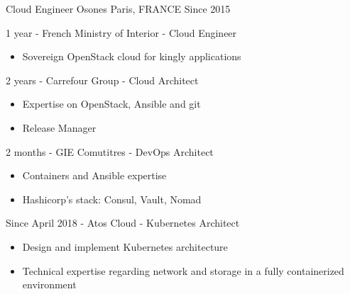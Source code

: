 

\begin{cventries}

  \cventry
    {Cloud Engineer} %
    {Osones} %
    {Paris, FRANCE} %
    {Since 2015} %
    {
      \begin{cvitems} %
      \item {1 year - French Ministry of Interior - Cloud Engineer}
        \begin{itemize}
          \item {Sovereign OpenStack cloud for kingly applications}
        \end{itemize}

      \item {2 years - Carrefour Group - Cloud Architect}
        \begin{itemize}
          \item {Expertise on OpenStack, Ansible and git}
          \item {Release Manager}
        \end{itemize}

      \item {2 months - GIE Comutitres - DevOps Architect}
        \begin{itemize}
          \item {Containers and Ansible expertise}
          \item {Hashicorp's stack: Consul, Vault, Nomad}
        \end{itemize}

      \item {Since April 2018 - Atos Cloud - Kubernetes Architect}
        \begin{itemize}
          \item {Design and implement Kubernetes architecture}
          \item {Technical expertise regarding network and storage in a fully containerized environment}
          \end{itemize}


\end{cvitems}}
\end{cventries}
